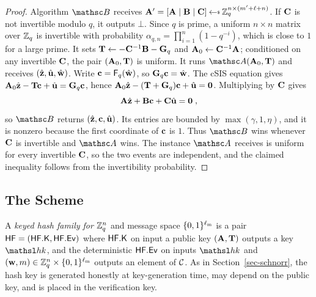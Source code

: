 \begin{proof}
Algorithm $\advB$ receives $\mat{A}' = [\mat{A} \mid \mat{B} \mid \mat{C}] \getsr \Zq^{n \times (m'+\ell+n)}$. If $\mathbf{C}$ is not invertible modulo $q$, it outputs $\bot$. Since $q$ is prime, a uniform $n\times n$ matrix over $\mathbb{Z}_q$ is invertible with probability $\alpha_{q,n} = \prod_{i=1}^{n}(1-q^{-i})$, which is close to $1$ for a large prime. It sets $\mathbf{T} \gets -\mathbf{C}^{-1}\mathbf{B} - \mathbf{G}_q$ and $\mathbf{A}_0 \gets \mathbf{C}^{-1}\mathbf{A}$; conditioned on any invertible $\mathbf{C}$, the pair $(\mathbf{A}_0, \mathbf{T})$ is uniform. It runs $\advA(\mat{A}_0, \mat{T})$ and receives $(\hat{\mathbf{z}}, \hat{\mathbf{u}}, \hat{\mathbf{w}})$. Write $\mathbf{c} = \mathsf{F}_q(\hat{\mathbf{w}})$, so $\mathbf{G}_q\mathbf{c} = \hat{\mathbf{w}}$. The cSIS equation gives $\mathbf{A}_0\hat{\mathbf{z}} - \mathbf{T}\mathbf{c} + \hat{\mathbf{u}} = \mathbf{G}_q\mathbf{c}$, hence $\mathbf{A}_0\hat{\mathbf{z}} - (\mathbf{T} + \mathbf{G}_q)\mathbf{c} + \hat{\mathbf{u}} = \mathbf{0}$. Multiplying by $\mathbf{C}$ gives
$$
\mathbf{A}\hat{\mathbf{z}} + \mathbf{B}\mathbf{c} + \mathbf{C}\hat{\mathbf{u}} = \mathbf{0} \;,
$$
so $\advB$ returns $(\hat{\mathbf{z}}, \mathbf{c}, \hat{\mathbf{u}})$. Its entries are bounded by $\max(\gamma, 1, \eta)$, and it is nonzero because the first coordinate of $\mathbf{c}$ is $1$. Thus $\advB$ wins whenever $\mathbf{C}$ is invertible and $\advA$ wins. The instance $\advA$ receives is uniform for every invertible $\mathbf{C}$, so the two events are independent, and the claimed inequality follows from the invertibility probability.
\end{proof}

\subsection{The Scheme} \label{sec-dil-scheme}

A \emph{keyed hash family for $\mathbb{Z}_q^n$} and message space $\{0,1\}^{\ell_{\mathrm{m}}}$ is a pair $\mathsf{HF} = (\mathsf{HF}.\mathsf{K}, \mathsf{HF}.\mathsf{Ev})$ where $\mathsf{HF}.\mathsf{K}$ on input a public key $(\mathbf{A}, \mathbf{T})$ outputs a key $\hk$, and the deterministic $\mathsf{HF}.\mathsf{Ev}$ on inputs $\hk$ and $(\mathbf{w}, m) \in \mathbb{Z}_q^n \times \{0,1\}^{\ell_{\mathrm{m}}}$ outputs an element of $\mathcal{C}$. As in Section~\ref{sec-schnorr}, the hash key is generated honestly at key-generation time, may depend on the public key, and is placed in the verification key.

